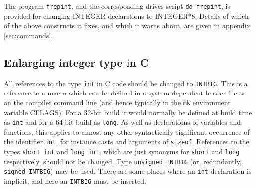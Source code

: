 \documentclass[twoside,11pt]{article}
\newcommand{\htmlref}[2]{#1}
\newcommand{\latexhtml}[2]{#1}
\renewcommand{\_}{\texttt{\symbol{95}}}
\newcommand{\xroutine}[1]{\htmlref{{\tt #1}}{#1}}
\newcommand{\xdofilter}[1]{\htmlref{{\tt do-#1}}{do-xxx}}
\newcommand{\file}[1]{{\tt #1}}
\newcommand{\cc}[1]{{\tt #1}}
\begin{document}
The program \xroutine{frepint}, and the corresponding driver script
\xdofilter{frepint}, is provided for changing 
INTEGER declarations to INTEGER*8.
Details of which of the above constructs it fixes, and which it
warns about, are given in 
\latexhtml{appendix \ref{sec:commands}}{\htmlref{the appendix}{frepint}}.


\subsection{Enlarging integer type in C\label{sec:cint}}

All references to the type \cc{int} in C code should be changed to 
\cc{INT\_BIG}.  This is a reference to a macro which can be defined
in a system-dependent header file or on the compiler command line 
(and hence typically in the \file{mk} environment variable CFLAGS).  
For a 32-bit build it would normally be defined at build time as 
\cc{int} and for a 64-bit build as \cc{long}.
As well as declarations of variables and functions, this applies
to almost any other syntactically significant occurrence of the
identifier \cc{int}, for instance casts and arguments of \cc{sizeof}.
References to the types \cc{short~int} and \cc{long~int},
which are just synonyms for \cc{short} and \cc{long} respectively,
should not be changed.  Type \cc{unsigned~INT\_BIG} 
(or, redundantly, \cc{signed~INT\_BIG}) may be used.
There are some places where an \cc{int} declaration is implicit,
and here an \cc{INT\_BIG} must be inserted.
\end{document}
